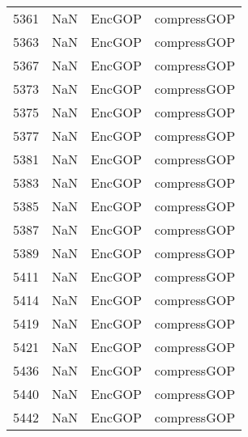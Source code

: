 \begin{tabular}{llll}
5361 &                   NaN &                     EncGOP &                               compressGOP \\
5363 &                   NaN &                     EncGOP &                               compressGOP \\
5367 &                   NaN &                     EncGOP &                               compressGOP \\
5373 &                   NaN &                     EncGOP &                               compressGOP \\
5375 &                   NaN &                     EncGOP &                               compressGOP \\
5377 &                   NaN &                     EncGOP &                               compressGOP \\
5381 &                   NaN &                     EncGOP &                               compressGOP \\
5383 &                   NaN &                     EncGOP &                               compressGOP \\
5385 &                   NaN &                     EncGOP &                               compressGOP \\
5387 &                   NaN &                     EncGOP &                               compressGOP \\
5389 &                   NaN &                     EncGOP &                               compressGOP \\
5411 &                   NaN &                     EncGOP &                               compressGOP \\
5414 &                   NaN &                     EncGOP &                               compressGOP \\
5419 &                   NaN &                     EncGOP &                               compressGOP \\
5421 &                   NaN &                     EncGOP &                               compressGOP \\
5436 &                   NaN &                     EncGOP &                               compressGOP \\
5440 &                   NaN &                     EncGOP &                               compressGOP \\
5442 &                   NaN &                     EncGOP &                               compressGOP \\

\end{tabular}
